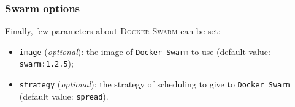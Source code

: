 \subsubsection{Swarm options}

Finally, few parameters about \textsc{Docker Swarm} can be set:

\begin{itemize}
  \item \texttt{image} (\emph{optional}): the image of \texttt{Docker Swarm} to use (default value: \texttt{swarm:1.2.5});
  \item \texttt{strategy} (\emph{optional}): the strategy of scheduling to give to \texttt{Docker Swarm} (default value: \texttt{spread}).
\end{itemize}
